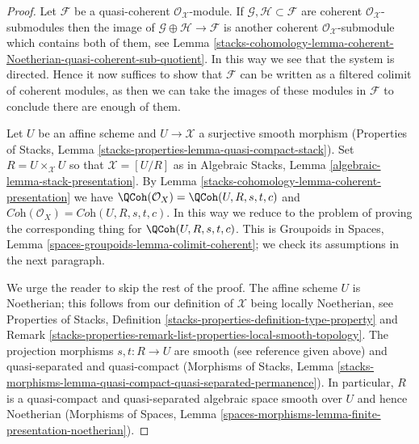 \begin{proof}
Let $\mathcal{F}$ be a quasi-coherent $\mathcal{O}_\mathcal{X}$-module.
If $\mathcal{G}, \mathcal{H} \subset \mathcal{F}$ are coherent
$\mathcal{O}_\mathcal{X}$-submodules then the image of
$\mathcal{G} \oplus \mathcal{H} \to \mathcal{F}$ is another
coherent $\mathcal{O}_\mathcal{X}$-submodule which contains both of them,
see Lemma \ref{stacks-cohomology-lemma-coherent-Noetherian-quasi-coherent-sub-quotient}.
In this way we see that the system is directed.
Hence it now suffices to show that $\mathcal{F}$ can be written as
a filtered colimit of coherent modules, as then we can take the
images of these modules in $\mathcal{F}$ to conclude there are
enough of them.

\medskip\noindent
Let $U$ be an affine scheme and $U \to \mathcal{X}$
a surjective smooth morphism (Properties of Stacks, Lemma
\ref{stacks-properties-lemma-quasi-compact-stack}).
Set $R = U \times_\mathcal{X} U$ so that $\mathcal{X} = [U/R]$
as in Algebraic Stacks, Lemma \ref{algebraic-lemma-stack-presentation}.
By Lemma \ref{stacks-cohomology-lemma-coherent-presentation} we have
$\QCoh(\mathcal{O}_X) = \QCoh(U, R, s, t, c)$ and
$\textit{Coh}(\mathcal{O}_X) = \textit{Coh}(U, R, s, t, c)$.
In this way we reduce to the problem of proving the corresponding thing for
$\QCoh(U, R, s, t, c)$. This is
Groupoids in Spaces, Lemma \ref{spaces-groupoids-lemma-colimit-coherent};
we check its assumptions in the next paragraph.

\medskip\noindent
We urge the reader to skip the rest of the proof.
The affine scheme $U$ is Noetherian; this follows from our definition
of $\mathcal{X}$ being locally Noetherian, see
Properties of Stacks, Definition
\ref{stacks-properties-definition-type-property} and
Remark \ref{stacks-properties-remark-list-properties-local-smooth-topology}.
The projection morphisms $s, t : R \to U$ are smooth (see reference
given above)
and quasi-separated and quasi-compact (Morphisms of Stacks, Lemma
\ref{stacks-morphisms-lemma-quasi-compact-quasi-separated-permanence}).
In particular, $R$ is a quasi-compact and quasi-separated algebraic space
smooth over $U$ and hence Noetherian
(Morphisms of Spaces, Lemma
\ref{spaces-morphisms-lemma-finite-presentation-noetherian}).
\end{proof}



